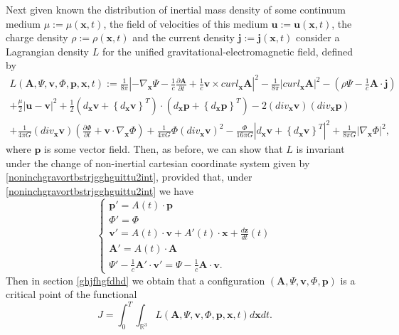 \documentclass{article}
\theoremstyle{definition}
\theoremstyle{remark}
\renewcommand{\vec}[1]{\mathbf{#1}}
\newcommand{\er}{\eqref}
\newcommand{\er}{\eqref}
\begin{document}
Next given known the distribution of inertial mass density of some
continuum medium $\mu:=\mu(\vec x,t)$, the field of velocities of
this medium $\vec u:=\vec u(\vec x,t)$, the charge density
$\rho:=\rho(\vec x,t)$ and the current density $\vec j:=\vec j(\vec
x,t)$ consider a Lagrangian density $L$ for the unified
gravitational-electromagnetic field, defined by
\begin{multline}\label{vhfffngghkjgghDDint}
L\left(\vec A,\Psi,\vec v,\Phi,\vec p,\vec
x,t\right):=\frac{1}{8\pi}\left|-\nabla_{\vec
x}\Psi-\frac{1}{c}\frac{\partial\vec A}{\partial t}+\frac{1}{c}\vec
v\times curl_{\vec x}\vec A\right|^2-\frac{1}{8\pi}\left|curl_{\vec
x}\vec A\right|^2-\left(\rho\Psi-\frac{1}{c}\vec A\cdot\vec
j\right)\\+\frac{\mu}{2}\left|\vec u-\vec v\right|^2+
\frac{1}{2}\left(d_{\vec x}\vec v+\left\{d_{\vec x}\vec
v\right\}^T\right)\cdot\left(d_{\vec x}\vec p+\left\{d_{\vec x}\vec
p\right\}^T\right)-2\left(div_{\vec x}\vec v\right)\left(div_{\vec
x}\vec p\right)\\+\frac{1}{4\pi G}\left(div_{\vec x}\vec
v\right)\left(\frac{\partial \Phi}{\partial t}+\vec
v\cdot\nabla_{\vec x} \Phi\right)+\frac{1}{4\pi
G}\Phi\left(div_{\vec x}\vec v\right)^2-\frac{\Phi}{16\pi
G}\left|d_{\vec x}\vec v+\left\{d_{\vec x}\vec
v\right\}^T\right|^2+\frac{1}{8\pi G}\left|\nabla_{\vec
x}\Phi\right|^2,
\end{multline}
where $\vec p$ is some vector field. Then, as before, we can show
that $L$ is invariant under the change of non-inertial cartesian
coordinate system given by \er{noninchgravortbstrjgghguittu2int},
provided that, under \er{noninchgravortbstrjgghguittu2int} we have
\begin{equation}\label{vyfgjhgjhvhgghintintint}
\begin{cases}
\vec p'=A(t)\cdot\vec p\\
\Phi'=\Phi
\\
\vec v'=A(t)\cdot \vec v+A'(t)\cdot\vec x+\frac{d\vec z}{dt}(t)\\
\vec A'=A(t)\cdot\vec A\\
\Psi'-\frac{1}{c}\vec A'\cdot\vec v'=\Psi-\frac{1}{c}\vec A\cdot\vec
v .
\end{cases}
\end{equation}
Then in section \ref{ghjfhgfdhd} we obtain that a configuration
$(\vec A,\Psi,\vec v,\Phi,\vec p)$ is a critical point of the
functional
\begin{equation}\label{btfffygtgyggyDDint}
J=\int_0^T\int_{\mathbb{R}^3}L\left(\vec A,\Psi,\vec v,\Phi,\vec
p,\vec x,t\right)d\vec x dt.
\end{equation}
\end{document}

